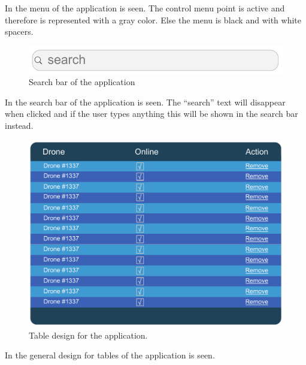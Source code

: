 In  the menu of the application is seen. The control menu point is active and therefore is represented with a gray color. Else the menu is black and with white spacers.

\begin{figure}[htb]
    \centering
    \includegraphics[width=\textwidth]{gfx/search.pdf}
    \caption{Search bar of the application}
    \label{fig:search_bar_design}
\end{figure}

In  the search bar of the application is seen. The ``search'' text will disappear when clicked and if the user types anything this will be shown in the search bar instead.

\begin{figure}[htb]
    \centering
    \includegraphics[width=\textwidth]{gfx/table.pdf}
    \caption{Table design for the application.}
    \label{fig:table_design}
\end{figure}

In  the general design for tables of the application is seen. 

